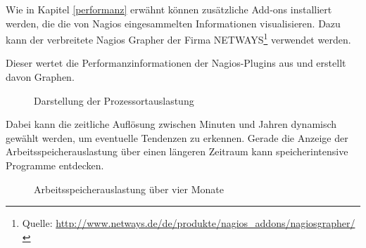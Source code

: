 Wie in Kapitel \ref{performanz} erwähnt können zusätzliche Add-ons installiert werden, die die von Nagios eingesammelten Informationen visualisieren.
Dazu kann der verbreitete Nagios Grapher der Firma NETWAYS\footnote{Quelle: \url{http://www.netways.de/de/produkte/nagios_addons/nagiosgrapher/}} verwendet werden.

Dieser wertet die Performanzinformationen der Nagios-Plugins aus und erstellt davon Graphen.

\begin{figure}[ht]
	\centering
		\caption{Darstellung der Prozessortauslastung}
		\label{iwrpload}
\end{figure}

Dabei kann die zeitliche Auflösung zwischen Minuten und Jahren dynamisch gewählt werden, um eventuelle Tendenzen zu erkennen.
Gerade die Anzeige der Arbeitsspeicherauslastung über einen längeren Zeitraum kann speicherintensive Programme entdecken.
\begin{figure}[ht]
	\centering
		\caption{Arbeitsspeicherauslastung über vier Monate}
		\label{bdb-mem}
\end{figure}



